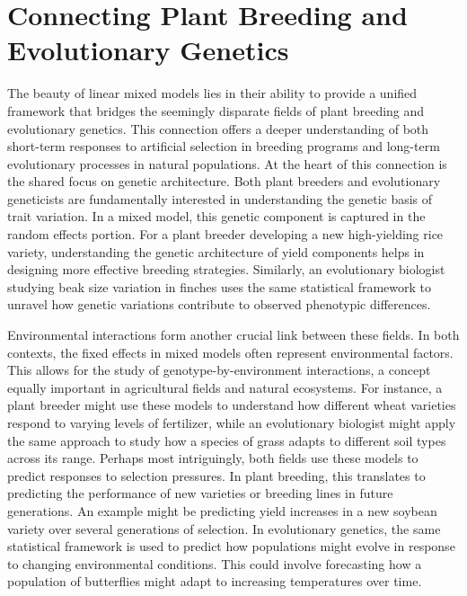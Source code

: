 \documentclass[12pt,a4paper]{article}
\begin{document}
\section{Connecting Plant Breeding and Evolutionary Genetics}

The beauty of linear mixed models lies in their ability to provide a unified framework that bridges the seemingly disparate fields of plant breeding and evolutionary genetics. This connection offers a deeper understanding of both short-term responses to artificial selection in breeding programs and long-term evolutionary processes in natural populations. At the heart of this connection is the shared focus on genetic architecture. Both plant breeders and evolutionary geneticists are fundamentally interested in understanding the genetic basis of trait variation. In a mixed model, this genetic component is captured in the random effects portion. For a plant breeder developing a new high-yielding rice variety, understanding the genetic architecture of yield components helps in designing more effective breeding strategies. Similarly, an evolutionary biologist studying beak size variation in finches uses the same statistical framework to unravel how genetic variations contribute to observed phenotypic differences.

Environmental interactions form another crucial link between these fields. In both contexts, the fixed effects in mixed models often represent environmental factors. This allows for the study of genotype-by-environment interactions, a concept equally important in agricultural fields and natural ecosystems. For instance, a plant breeder might use these models to understand how different wheat varieties respond to varying levels of fertilizer, while an evolutionary biologist might apply the same approach to study how a species of grass adapts to different soil types across its range. Perhaps most intriguingly, both fields use these models to predict responses to selection pressures. In plant breeding, this translates to predicting the performance of new varieties or breeding lines in future generations. An example might be predicting yield increases in a new soybean variety over several generations of selection. In evolutionary genetics, the same statistical framework is used to predict how populations might evolve in response to changing environmental conditions. This could involve forecasting how a population of butterflies might adapt to increasing temperatures over time.
\end{document}
